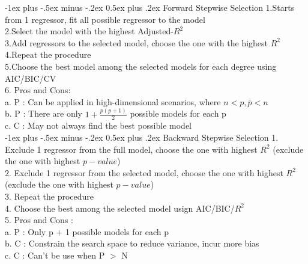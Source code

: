 \documentclass[10pt,landscape]{article}
\makeatletter
\renewcommand{\section}{\@startsection{section}{1}{0mm}%
                                {-1ex plus -.5ex minus -.2ex}%
                                {0.5ex plus .2ex}%
                                {\normalfont\large\bfseries}}
\makeatother
\begin{document}
\begin{multicols}{4}
\section{Forward Stepwise Selection}
1.Starts from 1 regressor, fit all possible regressor to the model\\
2.Select the model with the highest Adjusted-$R^2$\\
3.Add regressors to the selected model, choose the one with the highest $R^2$\\
4.Repeat the procedure\\
5.Choose the best model among the selected models for each degree using AIC/BIC/CV\\
6. Pros and Cons:\\
            a. P : Can be applied in high-dimensional scenarios, where $n<p, \bar{p} < n$\\
            b. P : There are only $1 + \frac{p(p+1)}{2}$ possible models for each p\\
            c. C : May not always find the best possible model\\

\section{Backward Stepwise Selection}
1. Exclude 1 regressor from the full model, choose the one with highest $R^2$ (exclude the one with highest $p-value$)\\
2. Exclude 1 regressor from the selected model, choose the one with highest $R^2$ (exclude the one with highest $p-value$)\\
3. Repeat the procedure\\
4. Choose the best among the selected model usign AIC/BIC/$R^2$\\
5. Pros and Cons : \\
            a. P : Only p + 1 possible models for each p\\
            b. C : Constrain the search space to reduce variance, incur more bias\\
            c. C : Can't be use when P $>$ N\\


\end{multicols}
\end{document}
